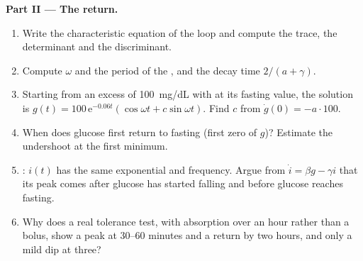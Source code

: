 \begin{problem}
\medskip
\noindent\textbf{Part II --- The return.}
\begin{enumerate}[resume]
  \item Write the characteristic equation of the loop and compute the
        trace, the determinant and the discriminant.
  \item Compute $\omega$ and the period of the , and
        the decay time $2/(a + \gamma)$.
  \item Starting from an excess of \qty{100}{mg/dL} with  at its
        fasting value, the solution is $g(t) = 100\,\mathrm{e}^{-0.06t}
        (\cos\omega t + c\sin\omega t)$. Find $c$ from $\dot g(0) = -a\cdot
        100$.
  \item When does glucose first return to fasting (first zero of $g$)?
        Estimate the undershoot at the first minimum.
  \item {}: $i(t)$ has the same exponential and frequency. Argue
        from $\dot i = \beta g - \gamma i$ that its peak comes after
        glucose has started falling and before glucose reaches fasting.
  \item Why does a real tolerance test, with absorption over an hour
        rather than a bolus, show a peak at 30--60 minutes and a return
        by two hours, and only a mild dip at three?
\end{enumerate}


\end{problem}
